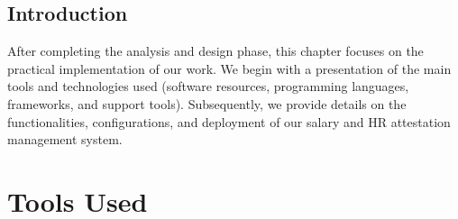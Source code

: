 \documentclass[a4paper,12pt]{report}
\begin{document}
\fancyhead[R]{\nouppercase{\rightmark}}
\begin{doublespace}
 \section*{Introduction}
\hspace{1cm}After completing the analysis and design phase, this chapter focuses on the practical implementation of our work. 
 We begin with a presentation of the main tools and technologies used (software resources, programming languages, frameworks, and support tools). 
 Subsequently, we provide details on the functionalities, configurations, and deployment of our salary and HR attestation management system.
\end{doublespace}

\section{Tools Used}
\end{document}
